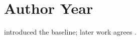 \documentclass{article}
\begin{document}
\section{Author Year}
\citet{doe2021} introduced the baseline; later work agrees \citep[see][]{doe2021}.


\end{document}

